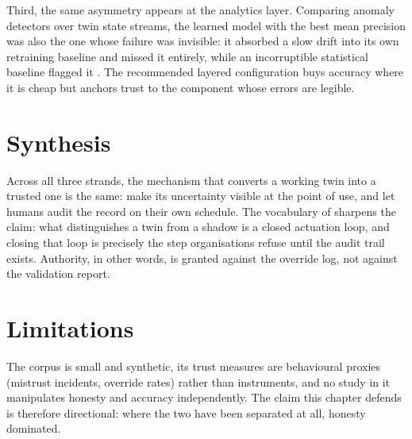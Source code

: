 Third, the same asymmetry appears at the analytics layer. Comparing
anomaly detectors over twin state streams, the learned model with the
best mean precision was also the one whose failure was invisible: it
absorbed a slow drift into its own retraining baseline and missed it
entirely, while an incorruptible statistical baseline flagged it
\citep{sample_ml_anomaly_2023}. The recommended layered configuration
buys accuracy where it is cheap but anchors trust to the component
whose errors are legible.

\section{Synthesis}
\label{sec:trust-synthesis}

Across all three strands, the mechanism that converts a working twin
into a trusted one is the same: make its uncertainty visible at the
point of use, and let humans audit the record on their own schedule.
The vocabulary of \citet{sample_dt_overview_2024} sharpens the claim:
what distinguishes a twin from a shadow is a closed actuation loop, and
closing that loop is precisely the step organisations refuse until the
audit trail exists. Authority, in other words, is granted against the
override log, not against the validation report.

\section{Limitations}
\label{sec:trust-limitations}

The corpus is small and synthetic, its trust measures are behavioural
proxies (mistrust incidents, override rates) rather than instruments,
and no study in it manipulates honesty and accuracy independently. The
claim this chapter defends is therefore directional: where the two have
been separated at all, honesty dominated.

